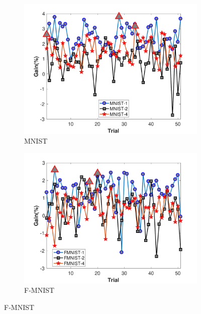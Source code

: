\begin{figure}
	\begin{subfigure}[b]{.46\linewidth}{}
		\includegraphics[keepaspectratio = True, scale = 0.31]{figures/MNIST_3}
		\centering
		\caption{MNIST}
		\vspace{2.0em}
	\end{subfigure}
	\begin{subfigure}[b]{.46\linewidth}
		\includegraphics[keepaspectratio = True, scale = 0.31]{figures/FMNIST_3}
		\caption{F-MNIST}
		\vspace{2.0em}
	\end{subfigure}
	
	\label{fig:trial2}
\end{figure}





